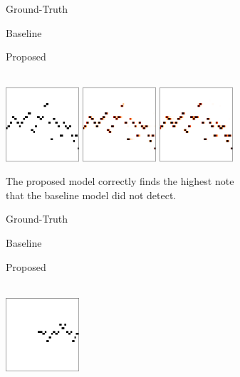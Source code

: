 \begin{figure}
	\begin{subfigure}[b]{\textwidth}
		\centering
		\parbox{0.3\textwidth}{\footnotesize\centering Ground-Truth}
		\quad
		\parbox{0.3\textwidth}{\footnotesize\centering Baseline}
		\quad
		\parbox{0.3\textwidth}{\footnotesize\centering Proposed}
		\\
		\vspace{0.5em}
		\includegraphics[width=0.3\textwidth]{cropped/2191-label.png}
		\quad
		\includegraphics[width=0.3\textwidth]{cropped/2191-baseline.png}
		\quad
		\includegraphics[width=0.3\textwidth]{cropped/2191-proposed.png}
		\caption{The proposed model correctly finds the highest note that the baseline model did not detect.}
		\label{}
	\end{subfigure}
	\begin{subfigure}[b]{\textwidth}
		\vspace{2em}
		\centering
		\parbox{0.3\textwidth}{\footnotesize\centering Ground-Truth}
		\quad
		\parbox{0.3\textwidth}{\footnotesize\centering Baseline}
		\quad
		\parbox{0.3\textwidth}{\footnotesize\centering Proposed}
		\\
		\vspace{0.5em}
		\includegraphics[width=0.3\textwidth]{cropped/2298-label.png}

\end{subfigure}
\end{figure}
